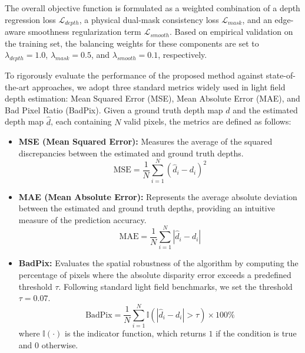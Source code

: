 \documentclass[lettersize,journal]{IEEEtran}
\begin{document}
The overall objective function is formulated as a weighted combination of a depth regression loss $\mathcal{L}_{depth}$, a physical dual-mask consistency loss $\mathcal{L}_{mask}$, and an edge-aware smoothness regularization term $\mathcal{L}_{smooth}$. Based on empirical validation on the training set, the balancing weights for these components are set to $\lambda_{depth} = 1.0$, $\lambda_{mask} = 0.5$, and $\lambda_{smooth} = 0.1$, respectively. 

To rigorously evaluate the performance of the proposed method against state-of-the-art approaches, we adopt three standard metrics widely used in light field depth estimation: Mean Squared Error (MSE), Mean Absolute Error (MAE), and Bad Pixel Ratio (BadPix). Given a ground truth depth map $d$ and the estimated depth map $\hat{d}$, each containing $N$ valid pixels, the metrics are defined as follows:

\begin{itemize}
    \item \textbf{MSE (Mean Squared Error):} Measures the average of the squared discrepancies between the estimated and ground truth depths.
    \begin{equation}
        \text{MSE} = \frac{1}{N} \sum_{i=1}^{N} (\hat{d}_i - d_i)^2
    \end{equation}
    
    \item \textbf{MAE (Mean Absolute Error):} Represents the average absolute deviation between the estimated and ground truth depths, providing an intuitive measure of the prediction accuracy.
    \begin{equation}
        \text{MAE} = \frac{1}{N} \sum_{i=1}^{N} |\hat{d}_i - d_i|
    \end{equation}
    
    \item \textbf{BadPix:} Evaluates the spatial robustness of the algorithm by computing the percentage of pixels where the absolute disparity error exceeds a predefined threshold $\tau$. Following standard light field benchmarks, we set the threshold $\tau = 0.07$.
    \begin{equation}
        \text{BadPix} = \frac{1}{N} \sum_{i=1}^{N} \mathbb{I}\left( |\hat{d}_i - d_i| > \tau \right) \times 100\%
    \end{equation}
    where $\mathbb{I}(\cdot)$ is the indicator function, which returns $1$ if the condition is true and $0$ otherwise.
\end{itemize}
\end{document}
